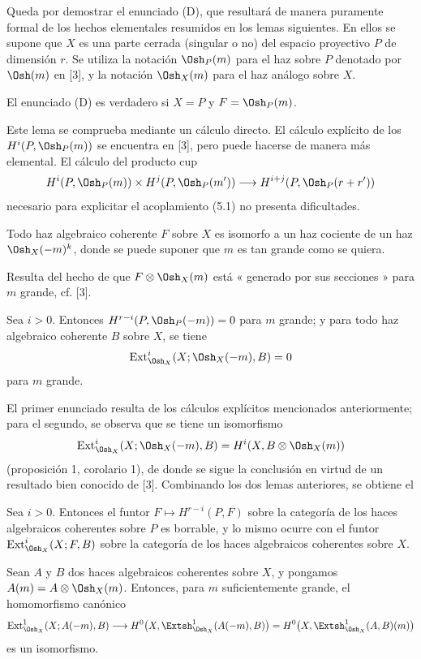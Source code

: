 Queda por demostrar el enunciado (D), que resultará de manera puramente formal de los hechos
elementales resumidos en los lemas siguientes. En ellos se supone que $X$ es una
parte cerrada (singular o no) del espacio proyectivo $P$ de dimensión $r$.
Se utiliza la notación $\Osh_P(m)$ para el haz sobre $P$ denotado por $\Osh(m)$ en
[3], y la notación $\Osh_X(m)$ para el haz análogo sobre $X$.

 El enunciado (D) es verdadero si $X=P$ y $F=\Osh_P(m)$.

Este lema se comprueba mediante un cálculo directo. El cálculo explícito de los
$H^{i}(P,\Osh_P(m))$ se encuentra en [3], pero puede hacerse de manera más
elemental. El cálculo del producto cup
\[
  H^{i}(P,\Osh_P(m))\times H^{j}(P,\Osh_P(m'))
  \longrightarrow H^{i+j}(P,\Osh_P(r+r'))
\]
necesario para explicitar el acoplamiento (5.1) no presenta dificultades.

 Todo haz algebraico coherente $F$ sobre $X$ es isomorfo a
un haz cociente de un haz $\Osh_X(-m)^{k}$, donde se puede suponer que $m$ es
tan grande como se quiera.

Resulta del hecho de que $F\otimes\Osh_X(m)$ está « generado por sus secciones » para
$m$ grande, cf. [3].

 Sea $i>0$. Entonces
$H^{r-i}(P,\Osh_P(-m))=0$ para $m$ grande; y para todo haz algebraico
coherente $B$ sobre $X$, se tiene
\[
  \operatorname{Ext}_{\Osh_X}^{i}(X;\Osh_X(-m),B)=0
\]
para $m$ grande.

El primer enunciado resulta de los cálculos explícitos mencionados anteriormente; para el
segundo, se observa que se tiene un isomorfismo
\[
  \operatorname{Ext}_{\Osh_X}^{i}(X;\Osh_X(-m),B)
  =H^{i}(X,B\otimes\Osh_X(m))
\]
(proposición 1, corolario 1), de donde se sigue la conclusión en virtud de un resultado bien
conocido de [3]. Combinando los dos lemas anteriores, se obtiene el

 Sea $i>0$. Entonces el funtor
$F\longmapsto H^{r-i}(P,F)$ sobre la categoría de los haces algebraicos coherentes
sobre $P$ es borrable, y lo mismo ocurre con el funtor
$\operatorname{Ext}_{\Osh_X}^{i}(X;F,B)$ sobre la categoría de los haces
algebraicos coherentes sobre $X$.

 Sean $A$ y $B$ dos haces algebraicos coherentes sobre
$X$, y pongamos $A(m)=A\otimes\Osh_X(m)$. Entonces, para $m$ suficientemente grande,
el homomorfismo canónico
\[
  \operatorname{Ext}_{\Osh_X}^{1}(X;A(-m),B)
  \longrightarrow H^{0}\bigl(X,\Extsh_{\Osh_X}^{1}(A(-m),B)\bigr)
  =H^{0}\bigl(X,\Extsh_{\Osh_X}^{1}(A,B)(m)\bigr)
\]
es un isomorfismo.

